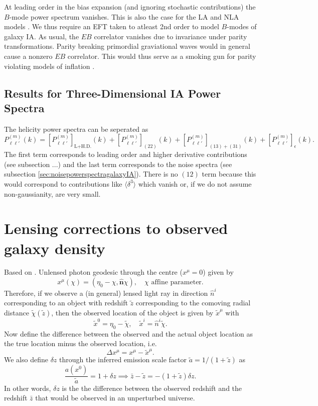 \documentclass[11pt]{article}
\begin{document}
At leading order in the bias expansion (and ignoring stochastic contributions) the $B$-mode power spectrum vanishes. This is also the case for the LA and NLA models \cite{bakx2023effectivefieldtheoryintrinsic}. We thus require an EFT taken to atleast 2nd order to model $B$-modes of galaxy IA. As usual, the $EB$ correlator vanishes due to invariance under parity transformations. Parity breaking primordial graviational waves would in general cause a nonzero $EB$ correlator. This would thus serve as a smoking gun for parity violating models of inflation \cite{Biagetti_2020}.


\subsection{Results for Three-Dimensional IA Power Spectra}
The helicity power spectra can be seperated as
\begin{equation}
    P_{\ell \ell'}^{(m)}(k) = [P^{(m)}_{\ell\ell'}]_{\text{L+H.D.}}(k) + [P^{(m)}_{\ell\ell'}]_{(22)}(k) + [P^{(m)}_{\ell\ell'}]_{(13) + (31)}(k) + [P^{(m)}_{\ell\ell'}]_{\epsilon}(k).
\end{equation}
The first term corresponds to leading order and higher derivative contributions (see subsection ...) %
and the last term corresponds to the noise spectra (see subsection \ref{sec:noisepowerspectragalaxyIA}). There is no $(12)$ term because this would correspond to contributions like $\langle \delta^3 \rangle$ which vanish or, if we do not assume non-gaussianity, are very small.

\section{Lensing corrections to observed galaxy density}
Based on \cite{Schmidt2013_clustering}. Unlensed photon geodesic through the centre ($x^\mu = 0$) given by
$$
x^\mu(\chi) = (\eta_0-\chi, \hat{\mathbf n}\chi), \quad \chi \text{ affine parameter.}
$$
Therefore, if we observe a (in general) lensed light ray in direction $\hat n^i$ corresponding to an object with redshift $\tilde z$ corresponding to the comoving radial distance $\tilde \chi(\tilde z)$, then the observed location of the object is given by $\tilde x^\mu$ with
\begin{equation}
    \tilde x^0 = \eta_0 - \tilde \chi, \quad \tilde x^i = \hat n^i \tilde \chi.
\end{equation}
Now define the difference between the observed and the actual object location as the true location minus the observed location, i.e.
\begin{equation}
    \Delta x^\mu = x^{\mu} - \tilde x^\mu.
\end{equation}
We also define $\delta z$ through the inferred emission scale factor $\tilde a = 1/(1+\tilde z)$ as
\begin{equation}
    \frac{a(x^0)}{\tilde a} = 1+\delta z \implies \bar z - \tilde z = -(1+\tilde z)\delta z.
\end{equation}
In other words, $\delta z$ is the the difference between the observed redshift and the redshift $\bar z$ that would be observed in an unperturbed universe.
\end{document}
